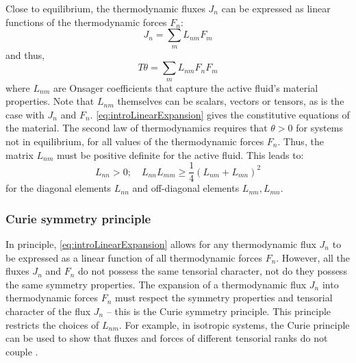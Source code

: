 Close to equilibrium, the thermodynamic fluxes $J_n$ can be expressed as linear functions of the thermodynamic forces $F_n$:
\begin{equation}\label{eq:introLinearExpansion}
    J_n = \sum_m L_{nm}F_m
\end{equation}
and thus, 
\begin{equation}
    T\theta = \sum_m L_{nm}F_nF_m
\end{equation}
where $L_{nm}$ are Onsager coefficients that capture the active fluid's material properties. Note that $L_{nm}$ themselves can be scalars, vectors or tensors, as is the case with $J_n$ and $F_n$. \autoref{eq:introLinearExpansion} gives the constitutive equations of the material. The second law of thermodynamics requires that $\theta > 0$ for systems not in equilibrium, for all values of the thermodynamic forces $F_n$. Thus, the matrix $L_{nm}$ must be positive definite for the active fluid. This leads to:
\begin{equation}
    L_{nn} > 0; \quad L_{nn}L_{mm} \geq \frac{1}{4}(L_{nm} + L_{mn})^2
\end{equation}
for the diagonal elements $L_{nn}$ and off-diagonal elements $L_{nm}, L_{mn}$.

\subsubsection{Curie symmetry principle}\label{subsubsec:introCurieSymmetry}
In principle, \autoref{eq:introLinearExpansion} allows for any thermodynamic flux $J_n$ to be expressed as a linear function of all thermodynamic forces $F_n$. However, all the fluxes $J_n$ and $F_n$ do not possess the same tensorial character, not do they possess the same symmetry properties. The expansion of a thermodynamic flux $J_n$ into thermodynamic forces $F_n$ must respect the symmetry properties and tensorial character of the flux $J_n$ -- this is the Curie symmetry principle. This principle restricts the choices of $L_{nm}$. For example, in isotropic systems, the Curie principle can be used to show that fluxes and forces of different tensorial ranks do not couple \citep{de2013non}.

